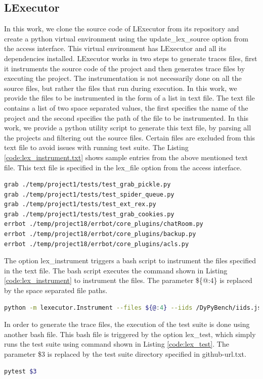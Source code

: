 \subsection{LExecutor}
In this work, we clone the source code of LExecutor from its repository and create a python virtual environment using the update\_lex\_source option from the access interface.
This virtual environment has LExecutor and all its dependencies installed.
LExecutor works in two steps to generate traces files, first it instruments the source code of the project and then generates trace files by executing the project.
The instrumentation is not necessarily done on all the source files, but rather the files that run during execution.
In this work, we provide the files to be instrumented in the form of a list in text file.
The text file contains a list of two space separated values, the first specifies the name of the project and the second specifies the path of the file to be instrumented.
In this work, we provide a python utility script to generate this text file, by parsing all the projects and filtering out the source files.
Certain files are excluded from this text file to avoid issues with running test suite.
The Listing \ref{code:lex_instrument.txt} shows sample entries from the above mentioned text file.
This text file is specified in the lex\_file option from the access interface.
\begin{lstlisting}[caption=lex\_instrument\_all.txt,label=code:lex_instrument.txt,language=Bash]
grab ./temp/project1/tests/test_grab_pickle.py
grab ./temp/project1/tests/test_spider_queue.py
grab ./temp/project1/tests/test_ext_rex.py
grab ./temp/project1/tests/test_grab_cookies.py
errbot ./temp/project18/errbot/core_plugins/chatRoom.py
errbot ./temp/project18/errbot/core_plugins/backup.py
errbot ./temp/project18/errbot/core_plugins/acls.py
\end{lstlisting}

The option lex\_instrument triggers a bash script to instrument the files specified in the text file.
The bash script executes the command shown in Listing \ref{code:lex_instrument} to instrument the files.
The parameter \$\{@:4\} is replaced by the space separated file paths. 
\begin{lstlisting}[caption=LExecutor Instrumentation,label=code:lex_instrument,language=Bash]
python -m lexecutor.Instrument --files ${@:4} --iids /DyPyBench/iids.json --validate
\end{lstlisting}

In order to generate the trace files, the execution of the test suite is done using another bash file.
This bash file is triggered by the option lex\_test, which simply runs the test suite using command shown in Listing \ref{code:lex_test}.
The parameter \$3 is replaced by the test suite directory specified in github-url.txt.
\begin{lstlisting}[caption=LExecutor Test Suite Execution,label=code:lex_test,language=Bash]
pytest $3
\end{lstlisting}

